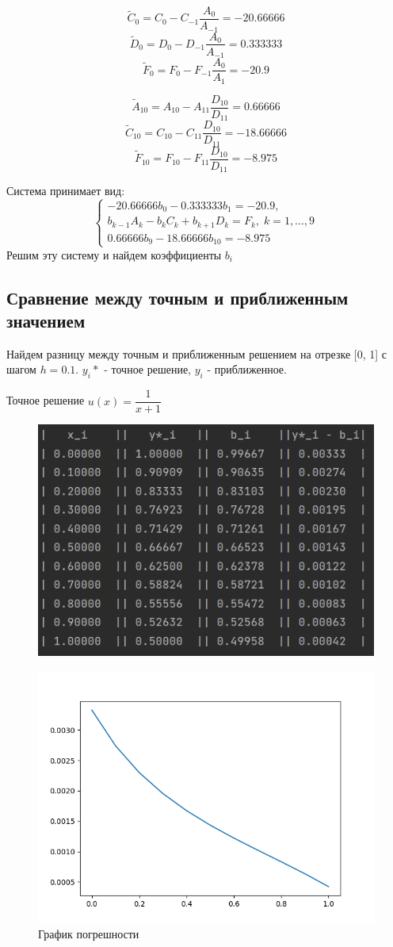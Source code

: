 \documentclass[a4paper, 14pt, fleqn]{extarticle}
\begin{document}
				\begin{minipage}{0.45\textwidth}
					\[\tilde{C}_0 = C_0 - C_{-1}\dfrac{A_0}{A_{-1}} = -20.66666 \]
					\[\tilde{D}_0 = D_0 - D_{-1}\dfrac{A_0}{A_{-1}} = 0.333333 \]
					\[\tilde{F}_0 = F_0 - F_{-1}\dfrac{A_0}{A_1} = -20.9 \]
				\end{minipage}%
				\begin{minipage}{0.45\textwidth}
					\[\tilde{A}_{10} = A_{10} - A_{11}\dfrac{D_{10}}{D_{11}} = 0.66666 \]
					\[\tilde{C}_{10} = C_{10} - C_{11}\dfrac{D_{10}}{D_{11}} = -18.66666 \]
					\[\tilde{F}_{10} = F_{10} - F_{11}\dfrac{D_{10}}{D_{11}} = -8.975 \]
				\end{minipage}%
			
				Система принимает вид:
				\[
					\begin{cases}
						-20.66666 b_0 -0.333333 b_1 = -20.9,\\
						b_{k-1}A_k - b_k C_k + b_{k+1}D_k = F_k,\; k = 1,\dots,9 \\
						0.66666 b_9 -18.66666 b_{10} = -8.975
					\end{cases}
				\]
				Решим эту систему и найдем коэффициенты $b_i$
				
			\subsection{Сравнение между точным и приближенным значением}
				 Найдем разницу между точным и приближенным решением на отрезке [0, 1] с шагом
				 $h = 0.1$. $y_i*$ - точное решение, $y_i$ - приближенное.
				 
				 Точное решение $u(x) = \dfrac{1}{x+1} $
				 
 				\begin{figure}[h]
				 	\centering
				 	\includegraphics[width = 0.7\linewidth]{table.png}
				\end{figure}
				\pagebreak
				\begin{figure}[h]
					\centering
					\includegraphics[width = 0.9\linewidth]{plot.png}
					\caption{График погрешности}
				\end{figure}
\end{document}
